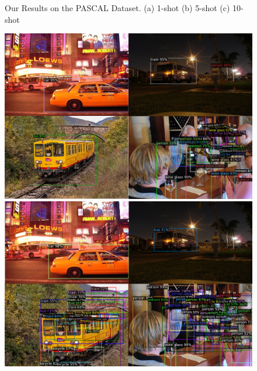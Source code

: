 \documentclass{article}
\begin{document}
\begin{figure}[h]
\begin{minipage}{0.47\textwidth}
  \subcaption{}
  \end{minipage}
  \caption{Our Results on the PASCAL Dataset. (a) 1-shot (b) 5-shot (c) 10-shot  }
  \label{finetuning}
\end{figure}


\begin{figure}[h]
  \begin{minipage}{0.47\textwidth}
  \includegraphics[width=\textwidth, height=0.17\textheight]{./../../figures/1shot.png}
  \subcaption{}
  \end{minipage}
  \begin{minipage}{0.47\textwidth}
  \includegraphics[width=\textwidth, height=0.17\textheight]{./../../figures/5shot.png}
  \subcaption{}
  \end{minipage}
  \begin{minipage}{0.47\textwidth}

\end{minipage}
\end{figure}
\end{document}
